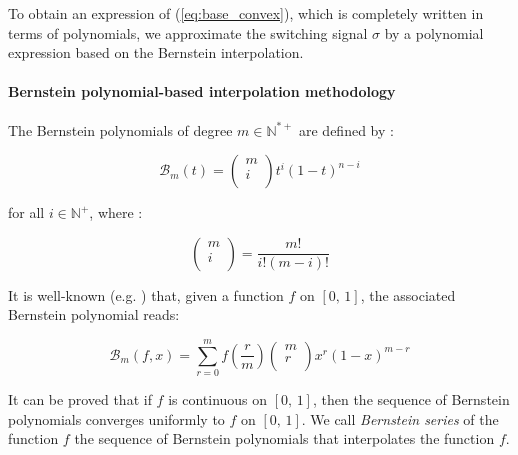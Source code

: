 \documentclass[12pt]{article}
\begin{document}
\noindent
To obtain an expression of (\ref{eq:base_convex}), which is completely written in terms of polynomials, we approximate the switching signal $\sigma$ by a polynomial expression 
based on the Bernstein interpolation.

\paragraph{Bernstein polynomial-based interpolation methodology}


The Bernstein polynomials of degree $m  \in \mathbb{N}^{*+}$ are defined by :

\begin{equation}
 \mathcal{B}_{ m} (t) = \left( \begin{array}{c}
                       m \\
                       i \\
                      \end{array} \right) t^i (1 - t)^{n-i} 
\end{equation}

\noindent
for all $i \in \mathbb{N}^+$, where :

\begin{equation} 
\left( \begin{array}{c}
  m \\
  i \\
 \end{array} \right) = \frac{m !}{i ! ( m - i) !}              
\end{equation}

\noindent
It is well-known (e.g. \cite{Philips}) that, given a function $f$ on $[0,\, 1]$, the associated Bernstein polynomial reads:

\noindent
\begin{equation}\label{eq:bernstein_exp}
 \mathcal{B}_m(f,x) = \sum_{r = 0}^m f \left( \frac{r}{m} \right) \left( \begin{array}{c}
  m \\
  r \\
 \end{array} \right) x^r (1 - x)^{m - r}
\end{equation}

\noindent
It can be proved that if $f$ is continuous on $[0, \, 1]$, then the sequence of Bernstein polynomials converges uniformly to $f$ on $[0, \, 1]$.
\noindent
We call {\it Bernstein series} of the function $f$ the sequence of Bernstein polynomials that interpolates the function $f$.
\end{document}
